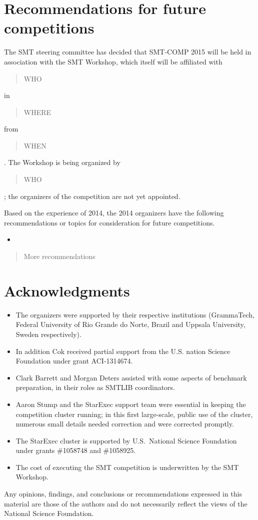 \documentclass[twosize,11pt]{article}
\newcommand{\comment}[2]{\begin{quote}\sc #1\marginpar{\textcolor{red}{$\ast^{\mbox{#2}}$}}\end{quote}}
\newcommand{\davidc}[1]{\comment{#1}{DC}}
\begin{document}
\section{Recommendations for future competitions}

The SMT steering committee has decided that SMT-COMP 2015 will be held in association with the SMT Workshop, which itself will be affiliated with \davidc{WHO} in \davidc{WHERE} from \davidc{WHEN}.
The Workshop is being organized by \davidc{WHO}; the organizers of the competition are not yet appointed.

Based on the experience of 2014, the 2014 organizers have the following recommendations or topics for consideration for future competitions.
\begin{itemize}
\item
\end{itemize}
\davidc{More recommendations}
\section*{Acknowledgments} 
\begin{itemize}
\item The organizers were supported by their respective institutions (GrammaTech, Federal University of Rio Grande do Norte, Brazil and Uppsala University, Sweden respectively). 

\item In addition Cok received partial support from the U.S. nation Science Foundation
under grant ACI-1314674.

\item Clark Barrett and Morgan Deters assisted with some aspects of benchmark preparation,
in their roles as SMTLIB coordinators.

\item Aaron Stump and the StarExec support team were essential in keeping the competition cluster running;
in this first large-scale, public use of the cluster, numerous small details needed correction and were corrected promptly.

\item The StarExec cluster is supported by 
U.S.\ National Science Foundation under grants \#1058748 and \#1058925.


\item The cost of executing the SMT competition is underwritten by the SMT Workshop. 
\end{itemize}

Any opinions,
findings, and conclusions or recommendations expressed in this
material are those of the authors and do not necessarily reflect the
views of the National Science Foundation.



\end{document}
